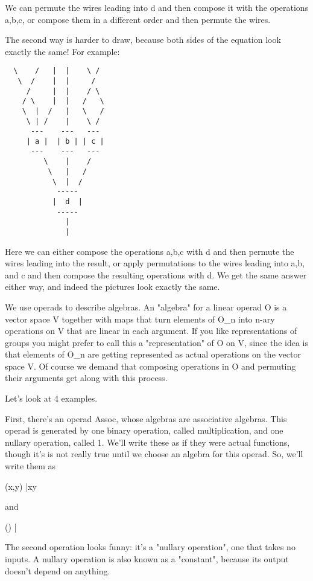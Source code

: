 We can permute the wires leading into d and then compose it with the
operations a,b,c, or compose them in a different order and then
permute the wires.  

The second way is harder to draw, because both sides of the equation
look exactly the same!  For example:

\begin{verbatim}
  \    /   |  |    \ /  
   \  /    |  |     / 
     /     |  |    / \ 
    / \    |  |   /   \
    \  |  /   |   \   /    
     \ | /    |    \ /    
      ---    ---   ---   
     | a |  | b | | c | 
      ---    ---   --- 
         \    |    /
          \   |   /  
           \  |  / 
            ----- 
           |  d  |  
            -----  
              |   
              |  
\end{verbatim}
    
Here we can either compose the operations a,b,c with d and then
permute the wires leading into the result, or apply permutations to
the wires leading into a,b, and c and then compose the resulting
operations with d.  We get the same answer either way, and indeed
the pictures look exactly the same.

We use operads to describe algebras.  An "algebra" for a
linear operad O is a vector space V together with maps that turn
elements of O_{n} into n-ary operations on V that are linear
in each argument.  If you like representations of groups you might
prefer to call this a "representation" of O on V, since the
idea is that elements of O_{n} are getting represented as
actual operations on the vector space V.  Of course we demand that
composing operations in O and permuting their arguments get along with
this process.

Let's look at 4 examples.

First, there's an operad Assoc, whose algebras are associative
algebras.  This operad is generated by one binary operation, called
multiplication, and one nullary operation, called 1.  We'll write
these as if they were actual functions, though it's is not really true
until we choose an algebra for this operad.  So, we'll write them as

(x,y) |\to  xy

and

() |

The second operation looks funny: it's a "nullary
operation", one that takes no inputs.  A nullary operation is
also known as a "constant", because its output doesn't
depend on anything.

